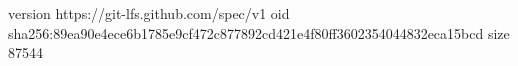 version https://git-lfs.github.com/spec/v1
oid sha256:89ea90e4ece6b1785e9cf472c877892cd421e4f80ff3602354044832eca15bcd
size 87544
